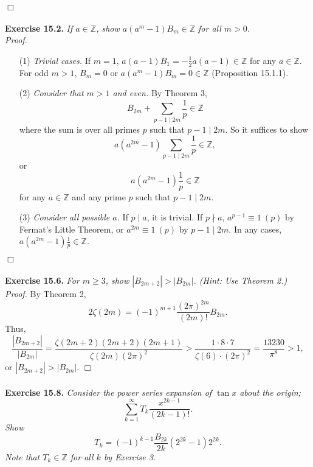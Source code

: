 \documentclass{article}
\begin{document}
$\Box$\\\\



\textbf{Exercise 15.2.}
\emph{If $a \in \mathbb{Z}$,
show $a(a^m - 1)B_m \in \mathbb{Z}$ for all $m > 0$.} \\

\emph{Proof.}
\begin{enumerate}
\item[(1)] \emph{Trivial cases.}
If $m = 1$, $a(a - 1) B_1 = -\frac{1}{2} a(a - 1) \in \mathbb{Z}$ for any $a \in \mathbb{Z}$.
For odd $m > 1$, $B_m = 0$ or $a(a^m - 1)B_m = 0 \in \mathbb{Z}$ (Proposition 15.1.1). \\
\item[(2)] \emph{Consider that $m > 1$ and even.}
By Theorem 3,
$$B_{2m} + \sum_{p-1 \mid 2m} \frac{1}{p} \in \mathbb{Z}$$
where the sum is over all primes $p$ such that $p-1 \mid 2m$.
So it suffices to show
$$a(a^{2m} - 1) \sum_{p-1 \mid 2m} \frac{1}{p} \in \mathbb{Z}, $$
or
$$a(a^{2m} - 1) \frac{1}{p} \in \mathbb{Z}$$
for any $a \in \mathbb{Z}$ and any prime $p$ such that $p-1 \mid 2m$.
\item[(3)] \emph{Consider all possible $a$.}
If $p \mid a$, it is trivial.
If $p \nmid a$, $a^{p - 1} \equiv 1 \: (p)$ by Fermat's Little Theorem,
or $a^{2m} \equiv 1 \: (p)$ by $p-1 \mid 2m$.
In any cases, $a(a^{2m} - 1)\frac{1}{p} \in \mathbb{Z}$.
\end{enumerate}
$\Box$ \\\\



\textbf{Exercise 15.6.}
\emph{For $m \geq 3$, show $|B_{2m+2}| > |B_{2m}|$. (Hint: Use Theorem 2.)} \\

\emph{Proof.}
By Theorem 2,
$$2 \zeta(2m) = (-1)^{m+1} \frac{(2\pi)^{2m}}{(2m)!} B_{2m}.$$
Thus,
$$\frac{|B_{2m+2}|}{|B_{2m}|}
= \frac{\zeta(2m+2)(2m+2)(2m+1)}{\zeta(2m)(2\pi)^2}
> \frac{1 \cdot 8 \cdot 7}{\zeta(6) \cdot (2\pi)^2}
= \frac{13230}{\pi^8}
> 1,$$
or $|B_{2m+2}| > |B_{2m}|$.
$\Box$ \\\\



\textbf{Exercise 15.8.}
\emph{Consider the power series expansion of $\tan x$ about the origin;
$$\sum_{k=1}^{\infty} T_k \frac{x^{2k - 1}}{(2k - 1)!}.$$
Show $$T_k = (-1)^{k-1} \frac{B_{2k}}{2k} (2^{2k} - 1) 2^{2k}.$$
Note that $T_k \in \mathbb{Z}$ for all $k$ by Exercise 3.} \\
\end{document}
